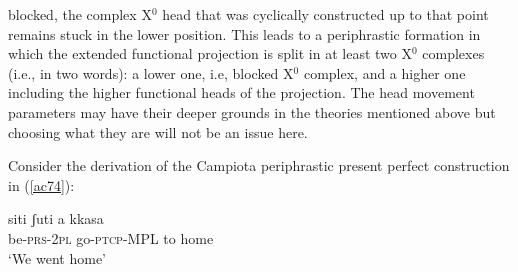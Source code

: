 \documentclass[output=paper]{langscibook}
\begin{document}
blocked, the complex X$^0$ head that was cyclically constructed up to that point remains stuck in the lower position. This leads to a periphrastic formation in which the extended functional projection is split in at least two X$^0$ complexes (i.e., in two words): a lower one, i.e, blocked X$^0$ complex, and a higher one including the higher functional heads of the projection. The head movement parameters may have their deeper grounds in the theories mentioned above but choosing what they are will not be an issue here.

Consider the derivation of the Campiota periphrastic present perfect construction in (\ref{ac74}):

\ea \label{ac74}\gll siti    ʃuti        a   kkasa\\
   be-\textsc{prs}-\textsc{2pl}  go-\textsc{ptcp}-MPL  to  home\\
   \glt ‘We went home’
\z
\end{document}
